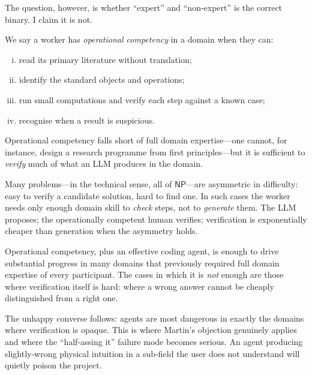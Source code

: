 The question, however, is whether ``expert'' and
``non-expert'' is the correct binary.  I claim it is not.

\begin{definition}\label{def:opcomp}
  We say a worker has \emph{operational competency} in a
  domain when they can:
  \begin{enumerate}[(i)]
    \item read its primary literature without translation;
    \item identify the standard objects and operations;
    \item run small computations and verify each step against
      a known case;
    \item recognise when a result is suspicious.
  \end{enumerate}
  Operational competency falls short of full domain
  expertise---one cannot, for instance, design a research
  programme from first principles---but it is sufficient to
  \emph{verify} much of what an LLM produces in the domain.
\end{definition}

\begin{intuition}
  Many problems---in the technical sense, all of $\textsf{NP}$---are
  asymmetric in difficulty: easy to verify a candidate
  solution, hard to find one.  In such cases the worker
  needs only enough domain skill to \emph{check} steps, not
  to \emph{generate} them.  The LLM proposes; the operationally
  competent human verifies; verification is exponentially
  cheaper than generation when the asymmetry holds.
\end{intuition}

\begin{keyresult}
  Operational competency, plus an effective coding agent,
  is enough to drive substantial progress in many domains
  that previously required full domain expertise of every
  participant.  The cases in which it is \emph{not} enough
  are those where verification itself is hard: where a
  wrong answer cannot be cheaply distinguished from a right
  one.
\end{keyresult}

The unhappy converse follows: agents are most dangerous in
exactly the domains where verification is opaque.  This is
where Martin's objection genuinely applies and where the
``half-assing it'' failure mode becomes serious.  An agent
producing slightly-wrong physical intuition in a sub-field
the user does not understand will quietly poison the
project.

